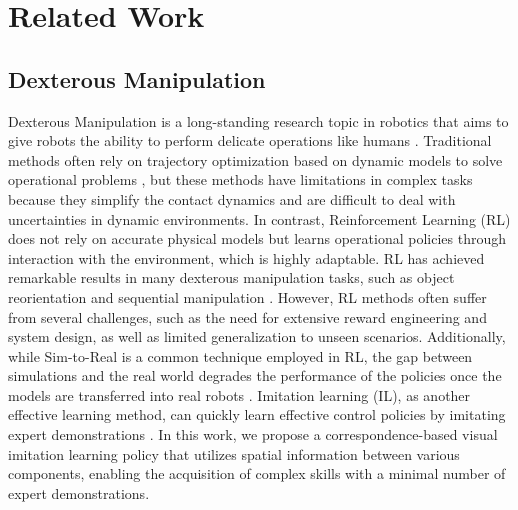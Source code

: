 \section{Related Work}
\subsection{Dexterous Manipulation}
Dexterous Manipulation is a long-standing research topic in robotics that aims to give robots the ability to perform delicate operations like humans \cite{chen2022towards, bai2014dexterous, qin2021dexmv, touch-dexterity}. 
Traditional methods often rely on trajectory optimization based on dynamic models to solve operational problems \cite{kumar2014real, mordatch2012contact, wang2022dexgraspnet}, but these methods have limitations in complex tasks because they simplify the contact dynamics and are difficult to deal with uncertainties in dynamic environments. 
In contrast, Reinforcement Learning (RL) does not rely on accurate physical models but learns operational policies through interaction with the environment, which is highly adaptable. 
RL has achieved remarkable results in many dexterous manipulation tasks, such as object reorientation \cite{chen2022system, qi2023hand, pitz2023dextrous, handa2023dextreme} and sequential manipulation \cite{chen2023sequential, gupta2021reset}.
However, RL methods often suffer from several challenges, such as the need for extensive reward engineering and system design, as well as limited generalization to unseen scenarios.
Additionally, while Sim-to-Real is a common technique employed in RL, the gap between simulations and the real world degrades the performance of the policies once the models are transferred into real robots \cite{zhao2020sim}.
Imitation learning (IL), as another effective learning method, can quickly learn effective control policies by imitating expert demonstrations \cite{10602544, wang2023mimicplay}. 
In this work, we propose a correspondence-based visual imitation learning policy that utilizes spatial information between various components, enabling the acquisition of complex skills with a minimal number of expert demonstrations. 

